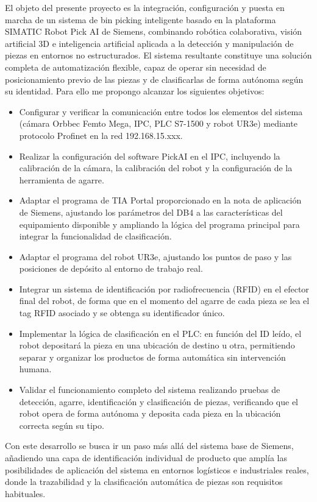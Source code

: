 \clearpage
{}


El objeto del presente proyecto es la integración, configuración y puesta en marcha de un sistema de bin picking inteligente basado en la plataforma SIMATIC Robot Pick AI de Siemens, combinando robótica colaborativa, visión artificial 3D e inteligencia artificial aplicada a la detección y manipulación de piezas en entornos no estructurados. El sistema resultante constituye una solución completa de automatización flexible, capaz de operar sin necesidad de posicionamiento previo de las piezas y de clasificarlas de forma autónoma según su identidad.
Para ello me propongo alcanzar los siguientes objetivos:

\begin{itemize}
	\item Configurar y verificar la comunicación entre todos los elementos del sistema (cámara Orbbec Femto Mega, IPC, PLC S7-1500 y robot UR3e) mediante protocolo Profinet en la red 192.168.15.xxx.

	\item Realizar la configuración del software PickAI en el IPC, incluyendo la calibración de la cámara, la calibración del robot y la configuración de la herramienta de agarre.

	\item Adaptar el programa de TIA Portal proporcionado en la nota de aplicación de Siemens, ajustando los parámetros del DB4 a las características del equipamiento disponible y ampliando la lógica del programa principal para integrar la funcionalidad de clasificación.

	\item Adaptar el programa del robot UR3e, ajustando los puntos de paso y las posiciones de depósito al entorno de trabajo real.

	\item Integrar un sistema de identificación por radiofrecuencia (RFID) en el efector final del robot, de forma que en el momento del agarre de cada pieza se lea el tag RFID asociado y se obtenga su identificador único.

	\item Implementar la lógica de clasificación en el PLC: en función del ID leído, el robot depositará la pieza en una ubicación de destino u otra, permitiendo separar y organizar los productos de forma automática sin intervención humana.

	\item Validar el funcionamiento completo del sistema realizando pruebas de detección, agarre, identificación y clasificación de piezas, verificando que el robot opera de forma autónoma y deposita cada pieza en la ubicación correcta según su tipo.
\end{itemize}

Con este desarrollo se busca ir un paso más allá del sistema base de Siemens, añadiendo una capa de identificación individual de producto que amplía las posibilidades de aplicación del sistema en entornos logísticos e industriales reales, donde la trazabilidad y la clasificación automática de piezas son requisitos habituales.
